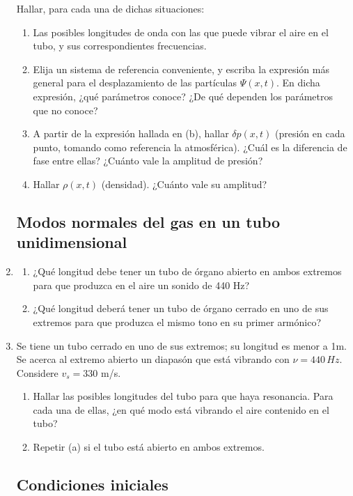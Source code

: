 \documentclass[11pt,spanish,a4paper]{article}
\begin{document}
\begin{enumerate}
Hallar, para cada una de dichas situaciones: 
\begin{enumerate}
\item Las posibles longitudes de onda con las que puede vibrar el aire en
el tubo, y sus correspondientes frecuencias. 
\item Elija un sistema de referencia conveniente, y escriba la expresión
más general para el desplazamiento de las partículas $\Psi(x,t)$.
En dicha expresión, ¿qué parámetros conoce? ¿De qué dependen los parámetros
que no conoce? 
\item A partir de la expresión hallada en (b), hallar $\delta p(x,t)$ (presión
en cada punto, tomando como referencia la atmosférica). ¿Cuál es la
diferencia de fase entre ellas? ¿Cuánto vale la amplitud de presión? 
\item Hallar $\rho(x,t)$ (densidad). ¿Cuánto vale su amplitud?
\end{enumerate}


\subsection*{Modos normales del gas en un tubo unidimensional}

\item 
\begin{enumerate}
\item ¿Qué longitud debe tener un tubo de órgano abierto en ambos extremos
para que produzca en el aire un sonido de 440 Hz? 
\item ¿Qué longitud deberá tener un tubo de órgano cerrado en uno de sus
extremos para que produzca el mismo tono en su primer armónico?
\end{enumerate}


\item Se tiene un tubo cerrado en uno de sus extremos; su longitud es menor
a 1m. Se acerca al extremo abierto un diapasón que está vibrando con
$\nu=440\unit{\, Hz}$. Considere $v_{s}=330$ m/s. 
\begin{enumerate}
\item Hallar las posibles longitudes del tubo para que haya resonancia.
Para cada una de ellas, ¿en qué modo está vibrando el aire contenido
en el tubo? 
\item Repetir (a) si el tubo está abierto en ambos extremos.
\end{enumerate}


\subsection*{Condiciones iniciales}


\end{enumerate}
\end{document}
